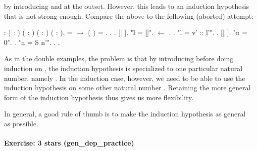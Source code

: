 \documentclass[12pt]{report}
\begin{document}
    by introducing  and  at the outset.  However, this leads
    to an induction hypothesis that is not strong enough.  Compare
    the above to the following (aborted) attempt: \begin{coqdoccode}
\coqdocemptyline
\coqdocnoindent
{}  : \coqdockw{\ensuremath{\forall}} ( : ) ( : )\coqdoceol
\coqdocindent{15.00em}
( :  ) ( : ),\coqdoceol
\coqdocindent{2.50em}
  =  \ensuremath{\rightarrow}\coqdoceol
\coqdocindent{2.50em}
 (  ) =  .\coqdoceol
\coqdocnoindent
{}.\coqdoceol
\coqdocindent{1.00em}
     .    [|  ].\coqdoceol
\coqdocemptyline
\coqdocindent{1.00em}
 "l = []".\coqdoceol
\coqdocindent{2.00em}
 \ensuremath{\leftarrow} . .\coqdoceol
\coqdocemptyline
\coqdocindent{1.00em}
 "l = v' :: l'".\coqdoceol
\coqdocindent{2.00em}
.    [| ].\coqdoceol
\coqdocindent{2.00em}
 "n = 0".  .\coqdoceol
\coqdocindent{2.00em}
 "n = S n'".\coqdoceol
\coqdocindent{3.00em}
 . .  \coqdocemptyline
\end{coqdoccode}
As in the double examples, the problem is that by
    introducing  before doing induction on , the induction
    hypothesis is specialized to one particular natural number, namely
    .  In the induction case, however, we need to be able to use
    the induction hypothesis on some other natural number .
    Retaining the more general form of the induction hypothesis thus
    gives us more flexibility.


    In general, a good rule of thumb is to make the induction hypothesis
    as general as possible. 

\paragraph{Exercise: 3 stars (gen\_dep\_practice)}
\end{document}
